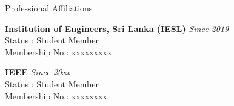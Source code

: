 \documentclass[
	11pt, %
]{resume} %
\begin{document}





\begin{rSection}{Professional Affiliations}

	\textbf{Institution of Engineers, Sri Lanka (IESL)} \hfill \textit{Since 2019} \\ 
	Status : Student Member \\
	Membership No.: xxxxxxxxx

	\textbf{IEEE} \hfill \textit{Since 20xx} \\ 
	Status : Student Member \\
	Membership No.: xxxxxxxx

\end{rSection}





\end{document}
